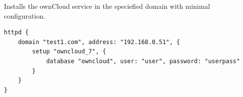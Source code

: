 Installs the ownCloud service in the speciefied domain with minimal configuration.

\begin{lstlisting}[style=Sscontrol,
label={lst:owncloud_7_example_script_minimal},
title={Httpd.groovy}]
httpd {
    domain "test1.com", address: "192.168.0.51", {
        setup "owncloud_7", {
            database "owncloud", user: "user", password: "userpass"
        }
    }
}
\end{lstlisting}

